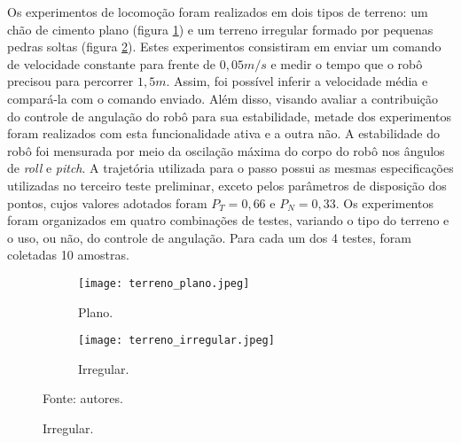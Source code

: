 \documentclass[../main.tex]{subfiles}
\begin{document}
  Os experimentos de locomoção foram realizados em dois tipos de terreno: um chão de cimento plano (figura \ref{fig:terreno_plano}) e um terreno irregular formado por pequenas pedras soltas (figura \ref{fig:terreno_irregular}). Estes experimentos consistiram em enviar um comando de velocidade constante para frente de $0,05 m/s$ e medir o tempo que o robô precisou para percorrer $1,5 m$. Assim, foi possível inferir a velocidade média e compará-la com o comando enviado. Além disso, visando avaliar a contribuição do controle de angulação do robô para sua estabilidade, metade dos experimentos foram realizados com esta funcionalidade ativa e a outra não. A estabilidade do robô foi mensurada por meio da oscilação máxima do corpo do robô nos ângulos de \textit{roll} e \textit{pitch}. A trajetória utilizada para o passo possui as mesmas especificações utilizadas no terceiro teste preliminar, exceto pelos parâmetros de disposição dos pontos, cujos valores adotados foram $P_T = 0,66$ e $P_N = 0,33$. Os experimentos foram organizados em quatro combinações de testes, variando o tipo do terreno e o uso, ou não, do controle de angulação. Para cada um dos 4 testes, foram coletadas 10 amostras.

  \begin{figure}[!htb]
    \centering
    \caption{Terrenos dos testes.}
    \begin{subfigure}[t]{0.24\textwidth}
      \centering
      \texttt{[image: terreno\_plano.jpeg]}
      \caption{Plano.}
      \label{fig:terreno_plano}
    \end{subfigure}
    \begin{subfigure}[t]{0.24\textwidth}
      \centering
      \texttt{[image: terreno\_irregular.jpeg]}
      \caption{Irregular.}
      \label{fig:terreno_irregular}
    \end{subfigure}
    \vfill
    Fonte: autores.
    \vspace{-\baselineskip}
    \label{fig:terrenos}
  \end{figure}
  
\end{document}
